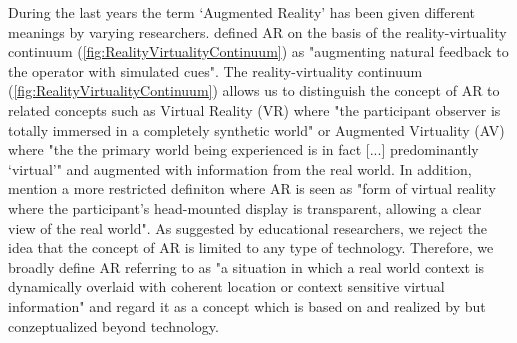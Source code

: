 During the last years the term ‘Augmented Reality’ has been given different meanings by varying researchers. \autocite [cf.][42]{Wu.2013} \cite{Milgram.1994b} defined AR on the basis of the reality-virtuality continuum (\ref{fig:RealityVirtualityContinuum}) as "augmenting natural feedback to the operator with simulated cues". The reality-virtuality continuum (\ref{fig:RealityVirtualityContinuum}) allows us to distinguish the concept of AR to related concepts such as Virtual Reality (VR) where "the participant observer is totally immersed in a completely synthetic world" or Augmented Virtuality (AV) where "the the primary world being experienced is in fact [...] predominantly ‘virtual’"\autocite[4]{Milgram.1994} %
and augmented with information from the real world. In addition, \cite{Milgram.1994b} mention a more restricted definiton where AR is seen as "form of virtual reality where the participant's head-mounted display is transparent, allowing a clear view of the real world". \autocite[283]{Milgram.1994b} As suggested by educational researchers,\autocite[cf.][42]{Wu.2013} we reject the idea that the concept of AR is limited to any type of technology. Therefore, we broadly define AR referring to \cite{Klopfer.2008} as "a situation in which a real world context is dynamically overlaid with coherent location or context sensitive virtual information"\autocite[205]{Klopfer.2008} and regard it as a concept which is based on and realized by but conzeptualized beyond technology.

